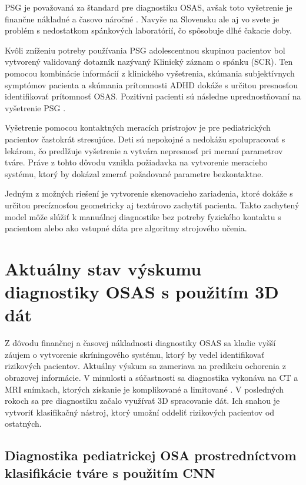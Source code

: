PSG je považovaná za štandard pre diagnostiku OSAS, avšak toto vyšetrenie je finančne
nákladné a časovo náročné \cite{hillman2013public}. Navyše na Slovensku ale aj vo svete je problém s nedostatkom spánkových laboratórií, čo spôsobuje dlhé čakacie doby.

Kvôli zníženiu potreby používania PSG adolescentnou skupinou pacientov bol vytvorený
validovaný dotazník nazývaný Klinický záznam o spánku (SCR). Ten pomocou kombinácie
informácií z klinického vyšetrenia, skúmania subjektívnych symptómov pacienta a skúmania
prítomnosti ADHD dokáže s určitou presnosťou identifikovať prítomnosť OSAS. Pozitívni
pacienti sú následne uprednostňovaní na vyšetrenie PSG \cite{Villa}.

Vyšetrenie pomocou kontaktných meracích prístrojov je pre pediatrických pacientov častokrát
stresujúce. Deti sú nepokojné a nedokážu spolupracovať s lekárom, čo predlžuje vyšetrenie a vytvára nepresnosť pri meraní parametrov tváre. Práve z tohto dôvodu vznikla požiadavka na vytvorenie meracieho
systému, ktorý by dokázal zmerať požadované parametre bezkontaktne.

Jedným z možných riešení je vytvorenie skenovacieho zariadenia, ktoré dokáže s určitou
precíznosťou geometricky aj textúrovo zachytiť pacienta. Takto zachytený model môže slúžiť k manuálnej diagnostike bez potreby fyzického kontaktu s pacientom alebo ako vstupné dáta pre algoritmy strojového učenia.

\section{Aktuálny stav výskumu diagnostiky OSAS s použitím 3D dát}

Z dôvodu finančnej a časovej nákladnosti diagnostiky OSAS sa kladie vyšší záujem o vytvorenie skríningového systému, ktorý by vedel identifikovať rizikových pacientov. Aktuálny výskum sa zameriava na predikciu ochorenia z obrazovej informácie. V minulosti a súčastnosti sa diagnostika vykonáva na CT a MRI snímkach, ktorých získanie je komplikované a limitované \cite{Whyte_Gibson_2018}. V posledných rokoch sa pre diagnostiku začalo využívať 3D spracovanie dát. Ich snahou je vytvoriť klasifikačný nástroj, ktorý umožní oddeliť rizikových pacientov od ostatných. 

\newpage
\subsection{Diagnostika pediatrickej OSA prostredníctvom klasifikácie tváre s použitím CNN}

